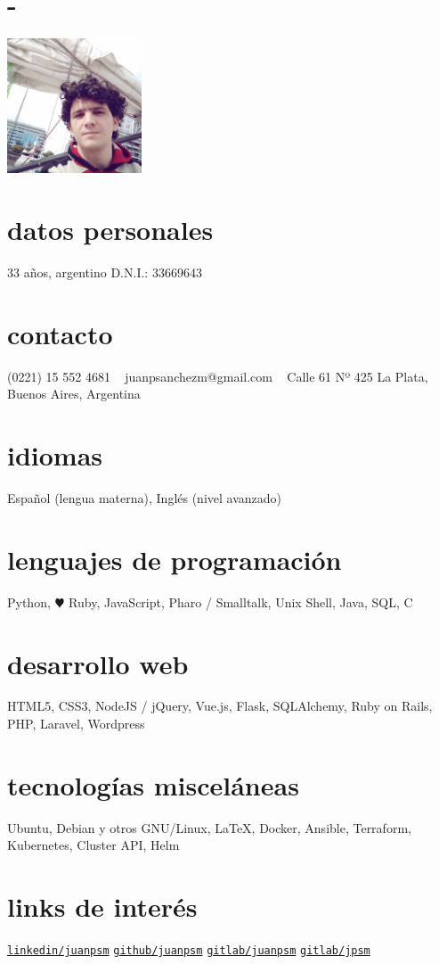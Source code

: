 \documentclass[espanol]{cv-style}     %
\begin{document}

\begin{aside}
\section{-}
\includegraphics[width=4cm]{22}
%
\section{datos personales}
33 años, argentino
D.N.I.: 33669643
%
\section{contacto}
(0221) 15 552 4681
~
juanpsanchezm@gmail.com
~
Calle 61 Nº 425
La Plata, Buenos Aires, Argentina
%
\section{idiomas}
Español (lengua materna),
Inglés (nivel avanzado)
%
\section{lenguajes de programación}
Python, {\color{red} $\varheartsuit$} Ruby, JavaScript, Pharo / Smalltalk, {Unix Shell}, Java, SQL, C
%
\section{desarrollo web}
HTML5, CSS3, NodeJS / jQuery, Vue.js, Flask, SQLAlchemy, Ruby on Rails, PHP, Laravel, Wordpress   
%
\section{tecnologías misceláneas}
Ubuntu, Debian y otros GNU/Linux, \LaTeX, Docker, Ansible, Terraform, Kubernetes, Cluster API, Helm
%
\section{links de interés}
\href{https://www.linkedin.com/in/juanpsm/}{\texttt{linkedin/juanpsm}}
\href{https://github.com/juanpsm}{\texttt{github/juanpsm}}
\href{https://gitlab.com/juanpsm}{\texttt{gitlab/juanpsm}}
\href{https://gitlab.catedras.linti.unlp.edu.ar/jpsm}{\texttt{gitlab/jpsm}}
\end{aside}
\vspace{-0.1cm}
\end{document}
